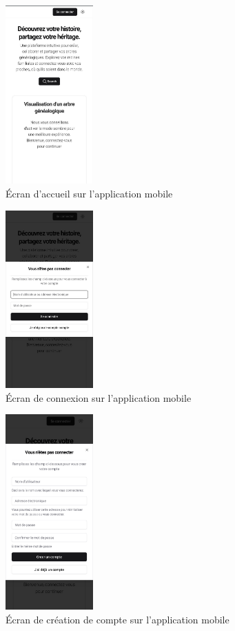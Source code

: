 \begin{figure}[H]
  \centering
  \includegraphics[width=0.3\textwidth]{./capture/homem.png}
  \caption{Écran d'accueil sur l'application mobile}
\end{figure}


\begin{figure}[H]
  \centering
  \includegraphics[width=0.3\textwidth]{capture/loginw.png}
\caption{Écran de connexion sur l'application mobile}
\end{figure}


\begin{figure}[H]
  \centering
  \includegraphics[width=0.3\textwidth]{capture/signupw.png}
  \caption{Écran de création de compte sur l'application mobile}
\end{figure}


